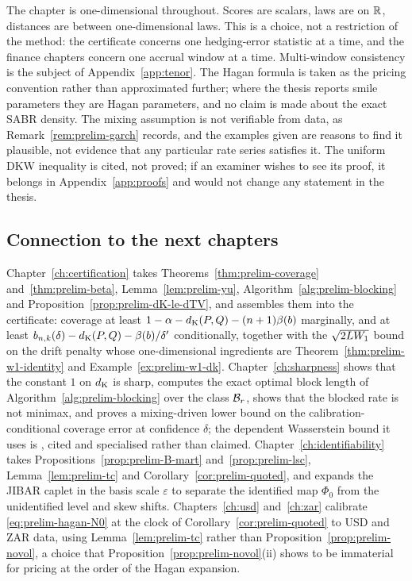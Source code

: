 \documentclass[../../../main.tex]{subfiles}
\begin{document}
The chapter is one-dimensional throughout. Scores are scalars, laws are on $\mathbb{R}$, distances are between one-dimensional laws. This is a choice, not a restriction of the method: the certificate concerns one hedging-error statistic at a time, and the finance chapters concern one accrual window at a time. Multi-window consistency is the subject of Appendix~\ref{app:tenor}. The Hagan formula is taken as the pricing convention rather than approximated further; where the thesis reports smile parameters they are Hagan parameters, and no claim is made about the exact SABR density. The mixing assumption is not verifiable from data, as Remark~\ref{rem:prelim-garch} records, and the examples given are reasons to find it plausible, not evidence that any particular rate series satisfies it. The uniform DKW inequality is cited, not proved; if an examiner wishes to see its proof, it belongs in Appendix~\ref{app:proofs} and would not change any statement in the thesis.

\subsection{Connection to the next chapters}

Chapter~\ref{ch:certification} takes Theorems~\ref{thm:prelim-coverage} and~\ref{thm:prelim-beta}, Lemma~\ref{lem:prelim-yu}, Algorithm~\ref{alg:prelim-blocking} and Proposition~\ref{prop:prelim-dK-le-dTV}, and assembles them into the certificate: coverage at least $1-\alpha-d_{\mathrm{K}}(P,Q)-(n+1)\beta(b)$ marginally, and at least $b_{n,k}(\delta)-d_{\mathrm{K}}(P,Q)-\beta(b)/\delta'$ conditionally, together with the $\sqrt{2LW_1}$ bound on the drift penalty whose one-dimensional ingredients are Theorem~\ref{thm:prelim-w1-identity} and Example~\ref{ex:prelim-w1-dk}. Chapter~\ref{ch:sharpness} shows that the constant $1$ on $d_{\mathrm{K}}$ is sharp, computes the exact optimal block length of Algorithm~\ref{alg:prelim-blocking} over the class $\mathcal B_{r}$, shows that the blocked rate is not minimax, and proves a mixing-driven lower bound on the calibration-conditional coverage error at confidence $\delta$; the dependent Wasserstein bound it uses is \cite{dedecker2017}, cited and specialised rather than claimed. Chapter~\ref{ch:identifiability} takes Propositions~\ref{prop:prelim-B-mart} and~\ref{prop:prelim-lsc}, Lemma~\ref{lem:prelim-tc} and Corollary~\ref{cor:prelim-quoted}, and expands the JIBAR caplet in the basis scale $\varepsilon$ to separate the identified map $\Phi_0$ from the unidentified level and skew shifts. Chapters~\ref{ch:usd} and~\ref{ch:zar} calibrate \eqref{eq:prelim-hagan-N0} at the clock of Corollary~\ref{cor:prelim-quoted} to USD and ZAR data, using Lemma~\ref{lem:prelim-tc} rather than Proposition~\ref{prop:prelim-novol}, a choice that Proposition~\ref{prop:prelim-novol}(ii) shows to be immaterial for pricing at the order of the Hagan expansion.
\end{document}
